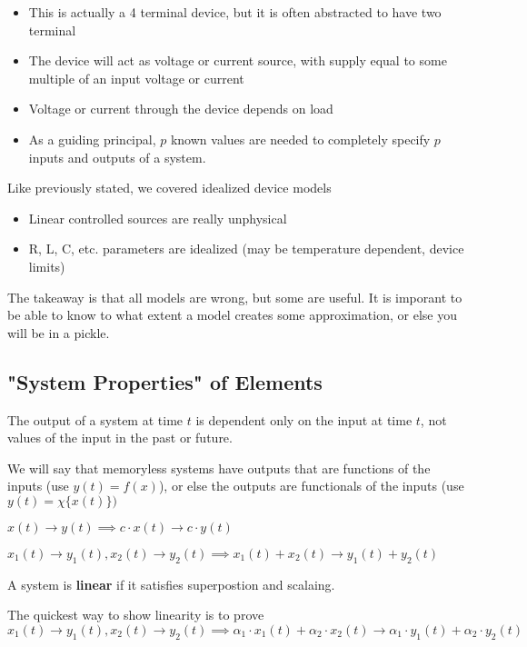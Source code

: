 \documentclass{report}
\begin{document}
\begin{itemize}
    \begin{itemize}
        \item This is actually a 4 terminal device, but it is often abstracted to have two terminal
        \item The device will act as voltage or current source, with supply equal to some multiple of an input voltage or current
        \item Voltage or current through the device depends on load
        \item As a guiding principal, $p$ known values are needed to completely specify $p$ inputs and outputs of a system.
    \end{itemize}
\end{itemize}
Like previously stated, we covered idealized device models
\begin{itemize}
    \item Linear controlled sources are really unphysical
    \item R, L, C, etc. parameters are idealized (may be temperature dependent, device limits)
\end{itemize}
The takeaway is that all models are wrong, but some are useful. It is imporant to be able to know to what extent a model creates some approximation, or else you will be in a pickle.

\subsection{"System Properties" of Elements}
\begin{definition}[Memoryless]
    The output of a system at time $t$ is dependent only on the input at time $t$, not values of the input in the past or future.
\end{definition}
We will say that memoryless systems have outputs that are functions of the inputs (use $y(t) = f(x)$), or else the outputs are functionals of the inputs (use $y(t) = \chi \{x(t)\})$
\begin{definition}[Scaling]
    $x(t) \rightarrow y(t) \implies c \cdot x(t) \rightarrow c \cdot y(t)$
\end{definition}
\begin{definition}[Superpostion]
    $x_1(t) \rightarrow y_1(t), x_2(t) \rightarrow y_2(t) \implies x_1(t) + x_2(t) \rightarrow y_1(t) + y_2(t)$
\end{definition}
\begin{definition}
    A system is \textbf{linear} if it satisfies superpostion and scalaing.
\end{definition}
The quickest way to show linearity is to prove
\begin{equation*}
    x_1(t) \rightarrow y_1(t), x_2(t) \rightarrow y_2(t) \implies \alpha_1 \cdot x_1(t) + \alpha_2 \cdot x_2(t) \rightarrow \alpha_1 \cdot y_1(t) + \alpha_2 \cdot y_2(t)
\end{equation*}
\end{document}
